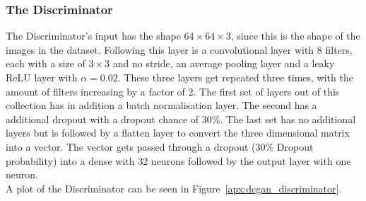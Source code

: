 \subsubsection{The Discriminator}
The Discriminator's input has the shape $64\times 64\times 3$, since this is the shape of the images in the dataset. Following this layer is a convolutional layer with 8 filters, each with a size of $3\times 3$ and no stride, an average \gls{pooling} layer and a leaky ReLU layer with $\alpha = 0.02$. These three layers get repeated three times, with the amount of filters increasing by a factor of 2. The first set of layers out of this collection has in addition a batch normalisation layer. The second has a additional \gls{dropout} with a dropout chance of 30\%. The last set has no additional layers but is followed by a flatten layer to convert the three dimensional matrix into a vector. The vector gets passed through a \gls{dropout} (30\% Dropout probability) into a \gls{dense} with 32 neurons followed by the output layer with one neuron.\\
A plot of the Discriminator can be seen in Figure~\ref{apx:dcgan_discriminator}.

